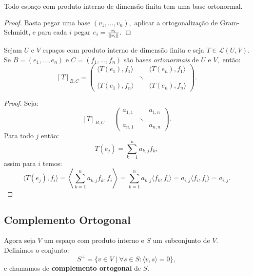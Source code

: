 \documentclass[11pt,twoside,a4paper]{book}
\begin{document}
\begin{corolario}
Todo espaço com produto interno de dimensão finita tem uma base ortonormal.
\end{corolario}
\begin{proof}
Basta pegar uma base $(v_1,\dots,v_n),$ aplicar a ortogonalização de Gram-Schmidt, e para cada $i$ pegar $e_i=\frac{v_i}{\norm{v_i}}.$
\end{proof}

\begin{proposicao}\label{matriz}
Sejam $U$ e $V$ espaços com produto interno de dimensão finita e seja $T\in\mathcal{L}(U,V).$ Se $B=(e_1,\dots,e_n)$ e $C=(f_1,\dots,f_n)$ são bases \emph{ortonormais} de $U$ e $V,$ então:
\[
[T]_{B,C}=\begin{pmatrix}
\langle T(e_1),f_1\rangle&&\langle T(e_n),f_1\rangle\\&\ddots&\\\langle T(e_1),f_n\rangle&&\langle T(e_n),f_n\rangle
\end{pmatrix}.
\]
\end{proposicao}
\begin{proof}
Seja:
\[
[T]_{B,C}=\begin{pmatrix}
a_{1,1}&&a_{1,n}\\&\ddots&\\a_{n,1}&&a_{n,n}
\end{pmatrix}.
\]
Para todo $j$ então:
\[
T(e_j)=\sum_{k=1}^na_{k,j}f_k,
\]
assim para $i$ temos:
\[
\langle T(e_j),f_i\rangle=\left\langle \sum_{k=1}^na_{k,j}f_k,f_i\right\rangle=\sum_{k=1}^na_{k,j}\langle f_k,f_i\rangle=a_{i,j}\langle f_i,f_i\rangle=a_{i,j}.
\]
\end{proof}

\subsection{Complemento Ortogonal}

\begin{definicao}
Agora seja $V$ um espaço com produto interno e $S$ um subconjunto de $V$. Definimos o conjunto:
\[
S^\perp=\{v\in V\mid \forall s\in S :\langle v,s\rangle=0\},
\]
e chamamos de \textbf{complemento ortogonal} de $S$.
\end{definicao}
\end{document}
